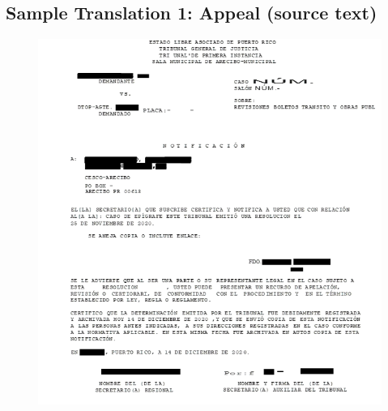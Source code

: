 \documentclass{article}
\begin{document}
\subsection{Sample Translation 1: Appeal (source text)}

\begin{figure}[H]
	\centering
	\includegraphics[width=\textwidth]{../sample_translations/source_1_1.png}
\end{figure}
\end{document}
